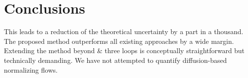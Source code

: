 \section{Conclusions}\label{sec:conclusions}

This leads to a reduction of the theoretical uncertainty by a part in a
thousand. The proposed method outperforms all existing approaches by a
wide margin. Extending the method beyond & three loops is conceptually
straightforward but technically demanding. We have not attempted to
quantify diffusion-based normalizing flows.

